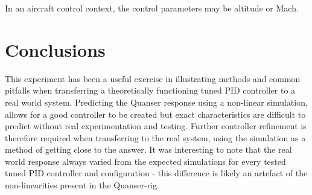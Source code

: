 In an aircraft control context, the control parameters may be altitude
or Mach.

\section{Conclusions}\label{conclusions}

This experiment has been a useful exercise in illustrating methods and
common pitfalls when transferring a theoretically functioning tuned PID
controller to a real world system. Predicting the Quanser response using
a non-linear simulation, allows for a good controller to be created but
exact characteristics are difficult to predict without real
experimentation and testing. Further controller refinement is therefore
required when transferring to the real system, using the simulation as a
method of getting close to the answer. It was interesting to note that
the real world response always varied from the expected simulations for
every tested tuned PID controller and configuration - this difference is
likely an artefact of the non-linearities present in the Quanser-rig.
